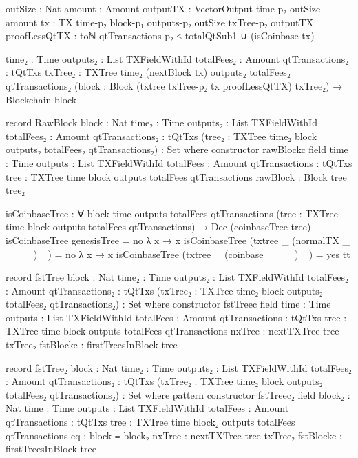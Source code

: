 \documentclass{beamer}
\begin{document}
\begin{code}
          {outSize : Nat}
          {amount : Amount}
          {outputTX : VectorOutput time-p₂ outSize amount}
          {tx : TX {time-p₂} {block-p₁} {outputs-p₂} {outSize} txTree-p₂ outputTX}
          {proofLessQtTX :
              toℕ qtTransactions-p₂ ≤ totalQtSub1
              ⊎
              (isCoinbase tx)}

          {time₂ : Time}
          {outputs₂ : List TXFieldWithId}
          {totalFees₂ : Amount}
          {qtTransactions₂ : tQtTxs}
          {txTree₂ : TXTree time₂ (nextBlock tx) outputs₂ totalFees₂ qtTransactions₂}
          (block : Block (txtree txTree-p₂ tx proofLessQtTX) txTree₂)
          → Blockchain block

    record RawBlock
      {block : Nat}
      {time₂ : Time}
      {outputs₂ : List TXFieldWithId}
      {totalFees₂ : Amount}
      {qtTransactions₂ : tQtTxs}
      (tree₂ : TXTree time₂ block outputs₂ totalFees₂ qtTransactions₂)
      : Set where
      constructor rawBlockc
      field
        {time}           : Time
        {outputs}        : List TXFieldWithId
        {totalFees}      : Amount
        {qtTransactions} : tQtTxs
        {tree}           : TXTree time block outputs totalFees qtTransactions
        rawBlock         : Block tree tree₂

    isCoinbaseTree : ∀
      {block time outputs totalFees qtTransactions}
      (tree : TXTree time block outputs totalFees qtTransactions)
      → Dec (coinbaseTree tree)
    isCoinbaseTree genesisTree = no λ x → x
    isCoinbaseTree (txtree _ (normalTX _ _ _ _) _) = no λ x → x
    isCoinbaseTree (txtree _ (coinbase _ _ _) _) = yes tt

    record fstTree
      {block : Nat}
      {time₂ : Time}
      {outputs₂ : List TXFieldWithId}
      {totalFees₂ : Amount}
      {qtTransactions₂ : tQtTxs}
      (txTree₂ : TXTree time₂ block outputs₂ totalFees₂ qtTransactions₂)
      : Set where
      constructor fstTreec
      field
        {time}               : Time
        {outputs}            : List TXFieldWithId
        {totalFees}          : Amount
        {qtTransactions}     : tQtTxs
        {tree}               : TXTree time block outputs totalFees qtTransactions
        nxTree               : nextTXTree tree txTree₂
        fstBlockc            : firstTreesInBlock tree

    record fstTree₂
      {block : Nat}
      {time₂ : Time}
      {outputs₂ : List TXFieldWithId}
      {totalFees₂ : Amount}
      {qtTransactions₂ : tQtTxs}
      (txTree₂ : TXTree time₂ block outputs₂ totalFees₂ qtTransactions₂)
      : Set where
      pattern
      constructor fstTreec₂
      field
        {block₂}              : Nat
        {time}               : Time
        {outputs}            : List TXFieldWithId
        {totalFees}          : Amount
        {qtTransactions}     : tQtTxs
        {tree}               : TXTree time block₂ outputs totalFees qtTransactions
        eq                   : block ≡ block₂
        nxTree               : nextTXTree tree txTree₂
        fstBlockc            : firstTreesInBlock tree


\end{code}
\end{document}
